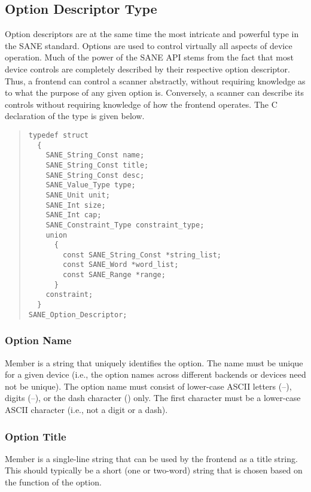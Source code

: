\documentclass[11pt,DVIps]{report}
\begin{document}
\subsection{Option Descriptor Type}\label{sec:odesc}

Option descriptors are at the same time the most intricate and
powerful type in the SANE standard.  Options are used to control
virtually all aspects of device operation.  Much of the power of the
SANE API stems from the fact that most device controls are completely
described by their respective option descriptor.  Thus, a frontend can
control a scanner abstractly, without requiring knowledge as to what
the purpose of any given option is.  Conversely, a scanner can
describe its controls without requiring knowledge of how the frontend
operates.  The C declaration of the
 type is given below.
\begin{quote}
\begin{verbatim}
typedef struct
  {
    SANE_String_Const name;
    SANE_String_Const title;
    SANE_String_Const desc;
    SANE_Value_Type type;
    SANE_Unit unit;
    SANE_Int size;
    SANE_Int cap;
    SANE_Constraint_Type constraint_type;
    union
      {
        const SANE_String_Const *string_list;
        const SANE_Word *word_list;
        const SANE_Range *range;
      }
    constraint;
  }
SANE_Option_Descriptor;
\end{verbatim}
\end{quote}

\subsubsection{Option Name}

Member  is a string that uniquely identifies the option.
The name must be unique for a given device (i.e., the option names
across different backends or devices need not be unique).  The option
name must consist of lower-case ASCII letters (--),
digits (--), or the dash character (\code{-}) only.
The first character must be a lower-case ASCII character (i.e., not a
digit or a dash).

\subsubsection{Option Title}

Member  is a single-line string that can be used by the
frontend as a title string.  This should typically be a short (one or
two-word) string that is chosen based on the function of the option.
\end{document}
